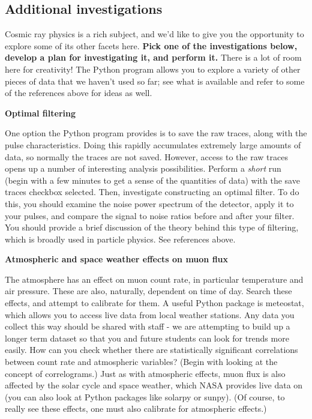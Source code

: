 \documentclass{../lab}
\begin{document}
\subsection{Additional investigations}

Cosmic ray physics is a rich subject, and we'd like to give you the opportunity to explore some of its other facets here. \textbf{Pick one of the investigations below, develop a plan for investigating it, and perform it.} There is a lot of room here for creativity! The Python program allows you to explore a variety of other pieces of data that we haven't used so far; see what is available and refer to some of the references above for ideas as well.

\textbf{Optimal filtering}

One option the Python program provides is to save the raw traces, along with the pulse characteristics. Doing this rapidly accumulates extremely large amounts of data, so normally the traces are not saved. However, access to the raw traces opens up a number of interesting analysis possibilities. Perform a \textit{short} run (begin with a few minutes to get a sense of the quantities of data) with the save traces checkbox selected. Then, investigate constructing an optimal filter. To do this, you should examine the noise power spectrum of the detector, apply it to your pulses, and compare the signal to noise ratios before and after your filter. You should provide a brief discussion of the theory behind this type of filtering, which is broadly used in particle physics. See references above.

\textbf{Atmospheric and space weather effects on muon flux}

The atmosphere has an effect on muon count rate, in particular temperature and air pressure. These are also, naturally, dependent on time of day. Search these effects, and attempt to calibrate for them. A useful Python package is meteostat, which allows you to access live data from local weather stations. Any data you collect this way should be shared with staff - we are attempting to build up a longer term dataset so that you and future students can look for trends more easily. How can you check whether there are statistically significant correlations between count rate and atmospheric variables? (Begin with looking at the concept of correlograms.) Just as with atmospheric effects, muon flux is also affected by the solar cycle and space weather, which NASA provides live data on (you can also look at Python packages like solarpy or sunpy). (Of course, to really see these effects, one must also calibrate for atmospheric effects.)
\end{document}
